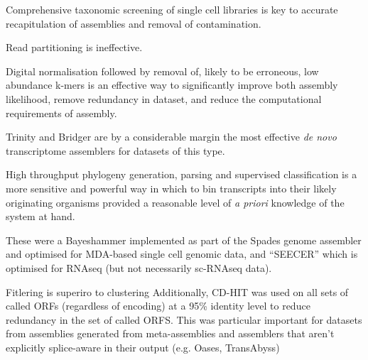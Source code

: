 Comprehensive taxonomic screening of single cell libraries is key to accurate recapitulation 
of assemblies and removal of contamination.

Read partitioning is ineffective. 


Digital normalisation followed by removal of, likely to be erroneous, low abundance
k-mers is an effective way to significantly improve both assembly likelihood, remove
redundancy in dataset, and reduce the computational requirements of assembly. 


Trinity and Bridger are by a considerable margin the most effective \textit{de novo}
transcriptome assemblers for datasets of this type.  




High throughput phylogeny generation, parsing and supervised classification is 
a more sensitive and powerful way in which to bin transcripts into their likely originating
organisms provided a reasonable level of \textit{a priori} knowledge of the system at hand.


These were a Bayeshammer \citep{Nikolenko2013} implemented as part of the Spades 
genome assembler \citep{Bankevich2012} and optimised for MDA-based single cell genomic data, 
and ``SEECER'' \citep{Le2013} which is optimised for RNAseq (but not necessarily sc-RNAseq
data). 





Fitlering is superiro to clustering
Additionally, CD-HIT \citep{Li2006} was used on all sets of called ORFs (regardless of encoding) 
at a 95\% identity level to reduce redundancy in the set of called ORFS.
This was particular important for datasets from assemblies generated from
meta-assemblies and assemblers that aren't explicitly splice-aware in their output
(e.g. Oases, TransAbyss)

